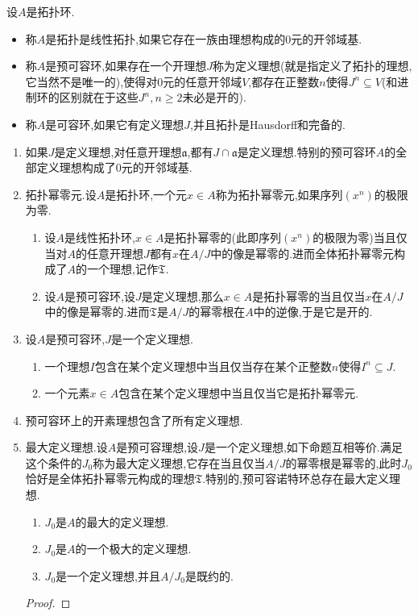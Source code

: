 设$A$是拓扑环.
\begin{itemize}
	\item 称$A$是拓扑是线性拓扑,如果它存在一族由理想构成的0元的开邻域基.
	\item 称$A$是预可容环,如果存在一个开理想$J$称为定义理想(就是指定义了拓扑的理想,它当然不是唯一的),使得对0元的任意开邻域$V$,都存在正整数$n$使得$J^n\subseteq V$(和进制环的区别就在于这些$J^n,n\ge2$未必是开的).
	\item 称$A$是可容环,如果它有定义理想$J$,并且拓扑是Hausdorff和完备的.
\end{itemize}
\begin{enumerate}
	\item 如果$J$是定义理想,对任意开理想$\mathfrak{a}$,都有$J\cap\mathfrak{a}$是定义理想.特别的预可容环$A$的全部定义理想构成了0元的开邻域基.
	\item 拓扑幂零元.设$A$是拓扑环,一个元$x\in A$称为拓扑幂零元,如果序列$(x^n)$的极限为零.
	\begin{enumerate}[(1)]
		\item 设$A$是线性拓扑环,$x\in A$是拓扑幂零的(此即序列$(x^n)$的极限为零)当且仅当对$A$的任意开理想$J$都有$x$在$A/J$中的像是幂零的.进而全体拓扑幂零元构成了$A$的一个理想,记作$\mathfrak{T}$.
		\item 设$A$是预可容环,设$J$是定义理想,那么$x\in A$是拓扑幂零的当且仅当$x$在$A/J$中的像是幂零的.进而$\mathfrak{T}$是$A/J$的幂零根在$A$中的逆像,于是它是开的.
	\end{enumerate}
	\item 设$A$是预可容环,$J$是一个定义理想.
	\begin{enumerate}[(1)]
		\item 一个理想$I$包含在某个定义理想中当且仅当存在某个正整数$n$使得$I^n\subseteq J$.
		\item 一个元素$x\in A$包含在某个定义理想中当且仅当它是拓扑幂零元.
	\end{enumerate}
	\item 预可容环上的开素理想包含了所有定义理想.
	\item 最大定义理想.设$A$是预可容理想,设$J$是一个定义理想,如下命题互相等价.满足这个条件的$J_0$称为最大定义理想,它存在当且仅当$A/J$的幂零根是幂零的,此时$J_0$恰好是全体拓扑幂零元构成的理想$\mathfrak{T}$.特别的,预可容诺特环总存在最大定义理想.
	\begin{enumerate}[(1)]
		\item $J_0$是$A$的最大的定义理想.
		\item $J_0$是$A$的一个极大的定义理想.
		\item $J_0$是一个定义理想,并且$A/J_0$是既约的.
	\end{enumerate}
    \begin{proof}
    	

\end{proof}
\end{enumerate}
